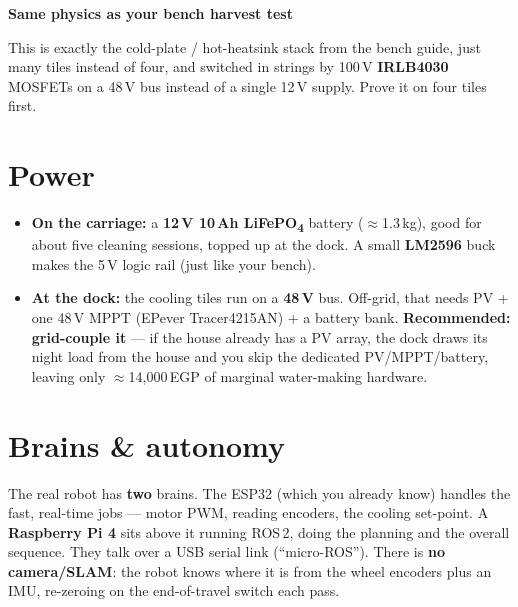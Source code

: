 \documentclass[11pt,a4paper]{article}
\newenvironment{tipbox}[1]
  {\par\medskip\noindent\begin{lrbox}{\gbbox}\begin{minipage}{0.95\linewidth}\footnotesize\textbf{#1}\par\smallskip}
  {\end{minipage}\end{lrbox}\setlength{\fboxsep}{8pt}\fcolorbox{green!45!black}{green!5}{\usebox{\gbbox}}\par\medskip}
\begin{document}
\begin{tipbox}{Same physics as your bench harvest test}
This is exactly the cold-plate / hot-heatsink stack from the bench guide, just many tiles instead of
four, and switched in strings by 100\,V \textbf{IRLB4030} MOSFETs on a 48\,V bus instead of a single
12\,V supply. Prove it on four tiles first.
\end{tipbox}

\section{Power}

\begin{itemize}[leftmargin=*,itemsep=1pt]
  \item \textbf{On the carriage:} a \textbf{12\,V 10\,Ah LiFePO\textsubscript{4}} battery ($\approx$1.3\,kg),
  good for about five cleaning sessions, topped up at the dock. A small \textbf{LM2596} buck makes the
  5\,V logic rail (just like your bench).
  \item \textbf{At the dock:} the cooling tiles run on a \textbf{48\,V} bus. Off-grid, that needs PV +
  one 48\,V MPPT (EPever Tracer4215AN) + a battery bank. \textbf{Recommended: grid-couple it} --- if the
  house already has a PV array, the dock draws its night load from the house and you skip the dedicated
  PV/MPPT/battery, leaving only $\approx$14,000\,EGP of marginal water-making hardware.
\end{itemize}

\section{Brains \& autonomy}

The real robot has \textbf{two} brains. The ESP32 (which you already know) handles the fast, real-time
jobs --- motor PWM, reading encoders, the cooling set-point. A \textbf{Raspberry Pi 4} sits above it
running ROS\,2, doing the planning and the overall sequence. They talk over a USB serial link
(``micro-ROS''). There is \textbf{no camera/SLAM}: the robot knows where it is from the wheel encoders
plus an IMU, re-zeroing on the end-of-travel switch each pass.
\end{document}
